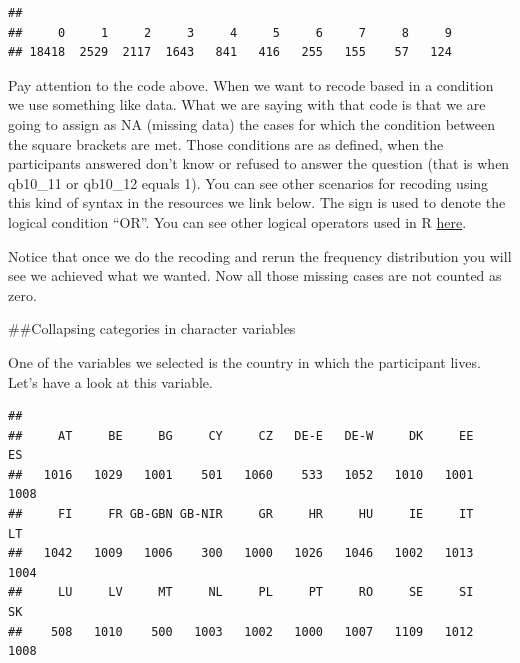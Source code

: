 \documentclass[]{book}
\newenvironment{Shaded}{\begin{snugshade}}{\end{snugshade}}
\newcommand{\DecValTok}[1]{\textcolor[rgb]{0.00,0.00,0.81}{#1}}
\newcommand{\KeywordTok}[1]{\textcolor[rgb]{0.13,0.29,0.53}{\textbf{#1}}}
\newcommand{\NormalTok}[1]{#1}
\newcommand{\OperatorTok}[1]{\textcolor[rgb]{0.81,0.36,0.00}{\textbf{#1}}}
\newcommand{\OtherTok}[1]{\textcolor[rgb]{0.56,0.35,0.01}{#1}}
\newcommand{\StringTok}[1]{\textcolor[rgb]{0.31,0.60,0.02}{#1}}
\theoremstyle{definition}
\theoremstyle{definition}
\theoremstyle{definition}
\theoremstyle{remark}
\begin{document}
\begin{Shaded}
\end{Shaded}

\begin{verbatim}
## 
##     0     1     2     3     4     5     6     7     8     9 
## 18418  2529  2117  1643   841   416   255   155    57   124
\end{verbatim}

Pay attention to the code above. When we want to recode based in a
condition we use something like data. What we are saying with that code
is that we are going to assign as NA (missing data) the cases for which
the condition between the square brackets are met. Those conditions are
as defined, when the participants answered don't know or refused to
answer the question (that is when qb10\_11 or qb10\_12 equals 1). You
can see other scenarios for recoding using this kind of syntax in the
resources we link below. The \textbar{} sign is used to denote the
logical condition ``OR''. You can see other logical operators used in R
\href{https://www.datamentor.io/r-programming/operator/}{here}.

Notice that once we do the recoding and rerun the frequency distribution
you will see we achieved what we wanted. Now all those missing cases are
not counted as zero.

\#\#Collapsing categories in character variables

One of the variables we selected is the country in which the participant
lives. Let's have a look at this variable.

\begin{Shaded}
\end{Shaded}

\begin{verbatim}
## 
##     AT     BE     BG     CY     CZ   DE-E   DE-W     DK     EE     ES 
##   1016   1029   1001    501   1060    533   1052   1010   1001   1008 
##     FI     FR GB-GBN GB-NIR     GR     HR     HU     IE     IT     LT 
##   1042   1009   1006    300   1000   1026   1046   1002   1013   1004 
##     LU     LV     MT     NL     PL     PT     RO     SE     SI     SK 
##    508   1010    500   1003   1002   1000   1007   1109   1012   1008
\end{verbatim}
\end{document}
